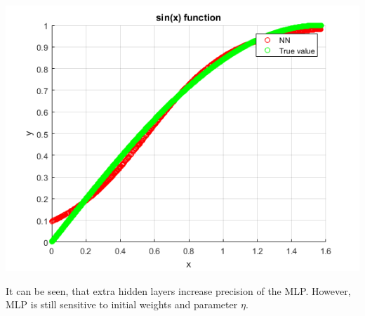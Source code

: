 \documentclass[a4paper, 12pt]{article}
\begin{document}
\begin{enumerate}
\includegraphics[scale = 0.8]{sin52.png}


\end{enumerate}

It can be seen, that extra hidden layers increase precision of the MLP. However, MLP is still sensitive to initial weights and parameter $\eta$.
\end{document}
